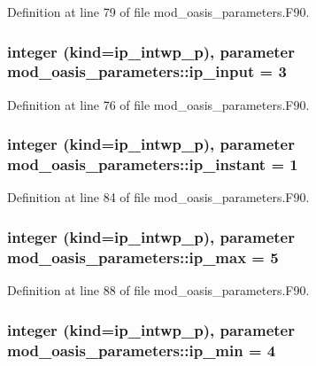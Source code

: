 Definition at line 79 of file mod\+\_\+oasis\+\_\+parameters.\+F90.

\hypertarget{classmod__oasis__parameters_a6a7bcd0e3a33573729f94098ecd9a922}{
\subsubsection[{ip\+\_\+input}]{\setlength{\rightskip}{0pt plus 5cm}integer (kind=ip\+\_\+intwp\+\_\+p), parameter mod\+\_\+oasis\+\_\+parameters\+::ip\+\_\+input = 3}}\label{classmod__oasis__parameters_a6a7bcd0e3a33573729f94098ecd9a922}


Definition at line 76 of file mod\+\_\+oasis\+\_\+parameters.\+F90.

\hypertarget{classmod__oasis__parameters_a1028581caadcb9d7506b25c6cd3efd01}{
\subsubsection[{ip\+\_\+instant}]{\setlength{\rightskip}{0pt plus 5cm}integer (kind=ip\+\_\+intwp\+\_\+p), parameter mod\+\_\+oasis\+\_\+parameters\+::ip\+\_\+instant = 1}}\label{classmod__oasis__parameters_a1028581caadcb9d7506b25c6cd3efd01}


Definition at line 84 of file mod\+\_\+oasis\+\_\+parameters.\+F90.

\hypertarget{classmod__oasis__parameters_abe7b7d586b50bd7c7d77c7834efa2801}{
\subsubsection[{ip\+\_\+max}]{\setlength{\rightskip}{0pt plus 5cm}integer (kind=ip\+\_\+intwp\+\_\+p), parameter mod\+\_\+oasis\+\_\+parameters\+::ip\+\_\+max = 5}}\label{classmod__oasis__parameters_abe7b7d586b50bd7c7d77c7834efa2801}


Definition at line 88 of file mod\+\_\+oasis\+\_\+parameters.\+F90.

\hypertarget{classmod__oasis__parameters_a194cfc3b7f2d515492e04fd6e8931c60}{
\subsubsection[{ip\+\_\+min}]{\setlength{\rightskip}{0pt plus 5cm}integer (kind=ip\+\_\+intwp\+\_\+p), parameter mod\+\_\+oasis\+\_\+parameters\+::ip\+\_\+min = 4}}\label{classmod__oasis__parameters_a194cfc3b7f2d515492e04fd6e8931c60}


